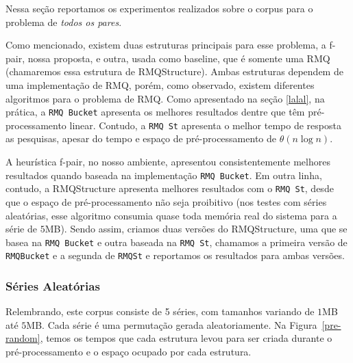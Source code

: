 \documentclass[12pt]{article}
\begin{document}
Nessa seção reportamos os experimentos realizados sobre 
o corpus para o problema de \textit{todos os pares}.

Como mencionado, existem duas estruturas principais para esse problema, a f-pair, nossa proposta,
e outra, usada como baseline, que é somente uma RMQ (chamaremos essa estrutura
de RMQStructure). Ambas estruturas dependem de uma implementação de RMQ, porém, como observado,
 existem diferentes algoritmos para o problema de RMQ. Como apresentado na seção \ref{lalal}, na prática, a \verb|RMQ Bucket|
 apresenta os melhores resultados dentre que têm pré-processamento linear.
Contudo, a \verb|RMQ St| apresenta o melhor tempo de resposta as pesquisas, apesar do tempo 
e espaço de pré-processamento de $\theta(n \log n)$.

A heurística f-pair, no nosso ambiente, apresentou consistentemente melhores resultados 
quando baseada na implementação \verb|RMQ Bucket|. Em outra linha, contudo, a RMQStructure apresenta
melhores resultados com o \verb|RMQ St|, desde que o espaço de pré-processamento 
não seja proibitivo (nos testes com séries aleatórias, esse algoritmo
consumia quase toda memória real do sistema para a série de $5$MB). Sendo assim, criamos duas versões
do RMQStructure, uma que se basea na \verb|RMQ Bucket| e 
outra baseada na \verb|RMQ St|, chamamos a primeira versão de \verb|RMQBucket|
e a segunda de \verb|RMQSt| e reportamos os resultados para ambas versões.

\subsubsection{Séries Aleatórias}

Relembrando, este corpus consiste de 5 séries, com tamanhos variando de $1$MB até $5$MB.
Cada série é uma permutação gerada aleatoriamente. Na Figura~\ref{pre-random},
 temos os tempos que cada estrutura levou para ser criada durante o pré-processamento
e o espaço ocupado por cada estrutura.
\end{document}

